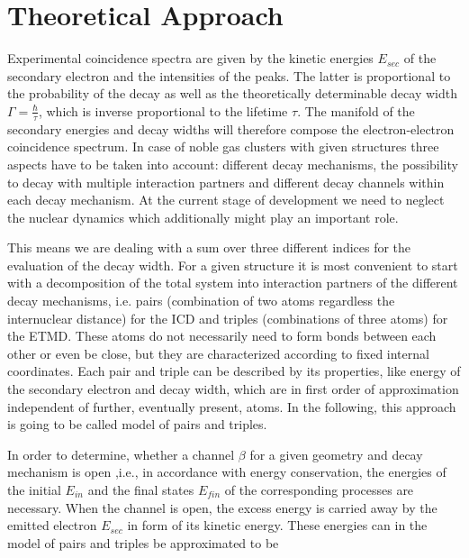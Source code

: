 \section{Theoretical Approach}
%
Experimental coincidence spectra are given by the kinetic energies $E_{sec}$
of the secondary electron
and the intensities of the peaks. The latter is proportional to the
probability of the decay as well as the theoretically determinable
decay width $\Gamma=\frac{\hbar}{\tau}$,
which is inverse proportional to the lifetime $\tau$. The manifold of the
secondary energies and decay widths will therefore compose the electron-electron
coincidence spectrum.
In case of noble gas clusters
with given structures three aspects have to be taken into account:
different decay mechanisms, the possibility to decay with multiple
interaction partners and different decay channels within each decay mechanism.
At the current stage of development we need to neglect the nuclear dynamics which
additionally might play an important role.

This means we are dealing with a sum over three different indices for the
evaluation of the decay width. For a given structure it is most convenient to
start with a decomposition of the total system into interaction partners of
the different decay mechanisms, i.e. pairs (combination of two atoms regardless
the internuclear distance) for the ICD and triples (combinations of three atoms)
for the ETMD.
These atoms do not necessarily need to form bonds between each other or
even be close, but they are characterized according to fixed internal
coordinates. Each pair and triple can be described by its properties, like
energy of the secondary electron and decay width,
which are in first order of approximation independent of further, eventually
present, atoms. In the following, this approach is going to be called
model of pairs and triples.



In order to determine, whether a channel $\beta$ for a given geometry and decay
mechanism is open ,i.e., in accordance with energy conservation,
the energies of the initial $E_{in}$ and the final states $E_{fin}$ of
the corresponding processes are necessary.
When the channel
is open, the excess energy is carried away by the emitted electron $E_{sec}$
in form of its kinetic energy. These energies can in the model
of pairs and triples be approximated to be

